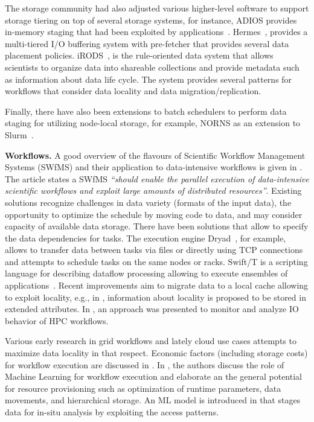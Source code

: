 \documentclass{superfri}
\begin{document}
The storage community had also adjusted various higher-level software to support storage tiering on top of several storage systems, for instance, ADIOS provides in-memory staging that had been exploited by applications~\cite{slawinska2013maya}.
Hermes~\cite{kougkas2020acceleration}, provides a multi-tiered I/O buffering system with pre-fetcher that provides several data placement policies.
iRODS~\cite{rajasekar2010irods}, is the rule-oriented data system that allows scientists to organize data into shareable collections and provide metadata such as information about data life cycle.
The system provides several patterns for workflows that consider data locality and data migration/replication.

Finally, there have also been extensions to batch schedulers to perform data staging for utilizing node-local storage, for example, NORNS as an extension to Slurm~\cite{miranda2019norns}.

\smallskip

\textbf{Workflows. }
A good overview of the flavours of Scientific Workflow Management Systems (SWfMS) and their application to data-intensive workflows is given in \cite{liu2015survey}.
The article states a SWfMS \textit{“should enable the parallel execution of data-intensive scientific workflows and exploit large amounts of distributed resources”}.
Existing solutions recognize challenges in data variety (formats of the input data), the opportunity to optimize the schedule by moving code to data, and may consider capacity of available data storage.
There have been solutions that allow to specify the data dependencies for tasks.
The execution engine Dryad~\cite{isard2007dryad}, for example, allows to transfer data between tasks via files or directly using TCP connections and attempts to schedule tasks on the same nodes or racks.
Swift/T is a scripting language for describing dataflow processing allowing to execute ensembles of applications~\cite{ozik2016desktop}.
Recent improvements aim to migrate data to a local cache allowing to exploit locality, e.g., in \cite{dai2018cross}, information about locality is proposed to be stored in extended attributes.
In \cite{TUIBIHWLSC19}, an approach was presented to monitor and analyze IO behavior of HPC workflows.

Various early research in grid workflows and lately cloud use cases attempts to maximize data locality in that respect.
Economic factors (including storage costs) for workflow execution are discussed in \cite{alkhanak2016cost}.
In \cite{deelman2019role}, the authors discuss the role of Machine Learning for workflow execution and elaborate an the general potential for resource provisioning such as optimization of runtime parameters, data movements, and hierarchical storage.
An ML model is introduced in \cite{subedi2019leveraging} that stages data for in-situ analysis by exploiting the access patterns.
\end{document}
